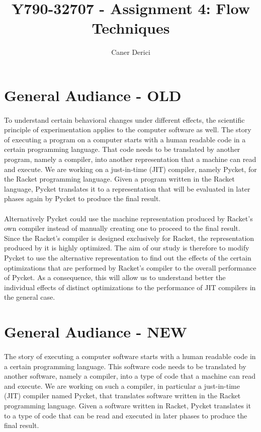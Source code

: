 \documentclass{article}
\title{Y790-32707 - Assignment 4: Flow Techniques}
\author{}
\date{Caner Derici}
\begin{document}

\maketitle%


\section{General Audiance - OLD}

\paragraph{} To understand certain behavioral changes under different effects, the
scientific principle of experimentation applies to the computer
software as well. The story of executing a program on a computer
starts with a human readable code in a certain programming
language. That code needs to be translated by another program, namely
a compiler, into another representation that a machine can read and
execute. We are working on a just-in-time (JIT) compiler, namely
Pycket, for the Racket programming language. Given a program written
in the Racket language, Pycket translates it to a representation that
will be evaluated in later phases again by Pycket to produce the final
result.

\paragraph{} Alternatively Pycket could use the machine representation
produced by Racket's own compiler instead of manually creating one to
proceed to the final result. Since the Racket's compiler is designed
exclusively for Racket, the representation produced by it is highly
optimized. The aim of our study is therefore to modify Pycket to use
the alternative representation to find out the effects of the certain
optimizations that are performed by Racket's compiler to the overall
performance of Pycket. As a consequence, this will allow us to
understand better the individual effects of distinct optimizations to
the performance of JIT compilers in the general case.



\section{General Audiance - NEW}

\paragraph{} The story of executing a computer software starts with a human
readable code in a certain programming language. This software code
needs to be translated by another software, namely a compiler, into a
type of code that a machine can read and execute. We are working on
such a compiler, in particular a just-in-time (JIT) compiler named
Pycket, that translates software written in the Racket programming
language. Given a software written in Racket, Pycket translates it to
a type of code that can be read and executed in later phases to
produce the final result.
\end{document}
